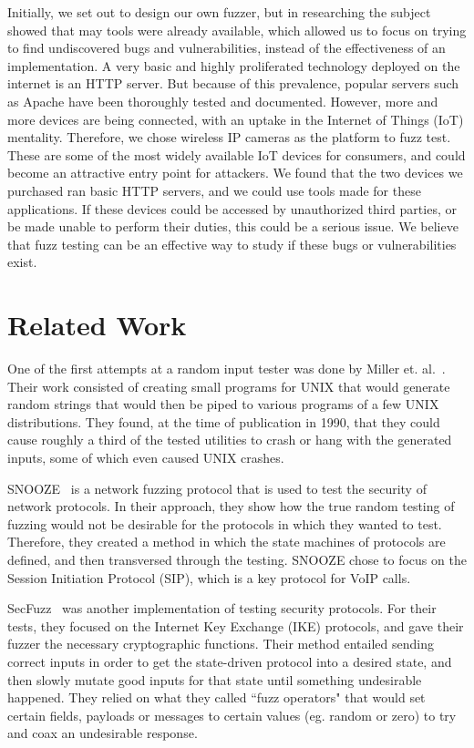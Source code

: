 \documentclass[letterpaper,twocolumn,10pt]{article}
\begin{document}
Initially, we set out to design our own fuzzer, but in researching the subject showed that may tools were already available, which allowed us to focus on trying to find undiscovered bugs and vulnerabilities, instead of the effectiveness of an implementation. A very basic and highly proliferated technology deployed on the internet is an HTTP server. But because of this prevalence, popular servers such as Apache have been thoroughly tested and documented. However, more and more devices are being connected, with an uptake in the Internet of Things (IoT) mentality. Therefore, we chose wireless IP cameras as the platform to fuzz test. These are some of the most widely available IoT devices for consumers, and could become an attractive entry point for attackers. We found that the two devices we purchased ran basic HTTP servers, and we could use tools made for these applications. If these devices could be accessed by unauthorized third parties, or be made unable to perform their duties, this could be a serious issue. We believe that fuzz testing can be an effective way to study if these bugs or vulnerabilities exist. 


\section{Related Work} 

One of the first attempts at a random input tester was done by Miller et. al.~\cite{millerUNIX}. Their work consisted of creating small programs for UNIX that would generate random strings that would then be piped to various programs of a few UNIX distributions. They found, at the time of publication in 1990, that they could cause roughly a third of the tested utilities to crash or hang with the generated inputs, some of which even caused UNIX crashes.

SNOOZE~\cite{snooze} is a network fuzzing protocol that is used to test the security of network protocols. In their approach, they show how the true random testing of fuzzing would not be desirable for the protocols in which they wanted to test. Therefore, they created a method in which the state machines of protocols are defined, and then transversed through the testing. SNOOZE chose to focus on the Session Initiation Protocol (SIP), which is a key protocol for VoIP calls.

SecFuzz~\cite{secfuzz} was another implementation of testing security protocols. For their tests, they focused on the Internet Key Exchange (IKE) protocols, and gave their fuzzer the necessary cryptographic functions. Their method entailed sending correct inputs in order to get the state-driven protocol into a desired state, and then slowly mutate good inputs for that state until something undesirable happened. They relied on what they called ``fuzz operators" that would set certain fields, payloads or messages to certain values (eg. random or zero) to try and coax an undesirable response.
\end{document}
